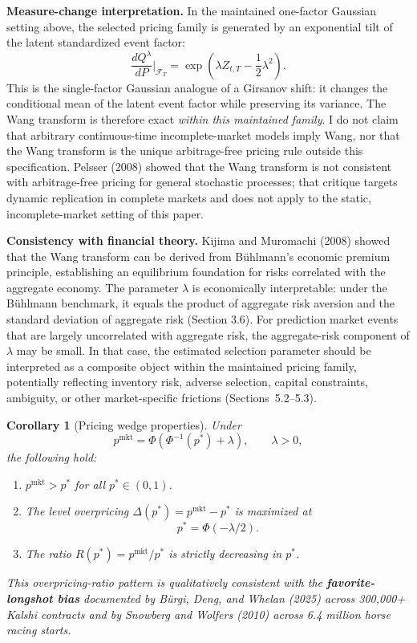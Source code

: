 \documentclass[12pt,a4paper]{article}
\newtheorem{corollary}{Corollary}
\begin{document}
\textbf{Measure-change interpretation.} In the maintained one-factor Gaussian setting above, the selected pricing family is generated by an exponential tilt of the latent standardized event factor:
\[
\frac{dQ^\lambda}{dP}\Big|_{\mathcal F_T}
=
\exp\!\left(\lambda Z_{t,T}-\frac{1}{2}\lambda^2\right).
\]
This is the single-factor Gaussian analogue of a Girsanov shift: it changes the conditional mean of the latent event factor while preserving its variance. The Wang transform is therefore exact \emph{within this maintained family}. I do not claim that arbitrary continuous-time incomplete-market models imply Wang, nor that the Wang transform is the unique arbitrage-free pricing rule outside this specification. Pelsser (2008) showed that the Wang transform is not consistent with arbitrage-free pricing for general stochastic processes; that critique targets dynamic replication in complete markets and does not apply to the static, incomplete-market setting of this paper.

\textbf{Consistency with financial theory.} Kijima and Muromachi (2008)
showed that the Wang transform can be derived from Bühlmann's economic
premium principle, establishing an equilibrium foundation for risks
correlated with the aggregate economy. The parameter \(\lambda\) is
economically interpretable: under the Bühlmann benchmark, it equals the
product of aggregate risk aversion and the standard deviation of
aggregate risk (Section 3.6). For prediction market events that are largely uncorrelated with aggregate risk, the aggregate-risk component of $\lambda$ may be small. In that case, the estimated selection parameter should be interpreted as a composite object within the maintained pricing family, potentially reflecting inventory risk, adverse selection, capital constraints, ambiguity, or other market-specific frictions (Sections~5.2--5.3).

\begin{corollary}[Pricing wedge properties]
Under
\[
p^{\mathrm{mkt}}=\Phi(\Phi^{-1}(p^*)+\lambda),
\qquad \lambda>0,
\]
the following hold:
\begin{enumerate}
\item $p^{\mathrm{mkt}}>p^*$ for all $p^*\in(0,1)$.
\item The level overpricing $\Delta(p^*)=p^{\mathrm{mkt}}-p^*$ is maximized at
\[
p^*=\Phi(-\lambda/2).
\]
\item The ratio $R(p^*)=p^{\mathrm{mkt}}/p^*$ is strictly decreasing in $p^*$.
\end{enumerate}
This overpricing-ratio pattern is qualitatively consistent with the \textbf{favorite-longshot bias} documented by Bürgi, Deng, and Whelan (2025) across 300,000+ Kalshi contracts and by Snowberg and Wolfers (2010) across 6.4 million horse racing starts.
\end{corollary}
\end{document}

